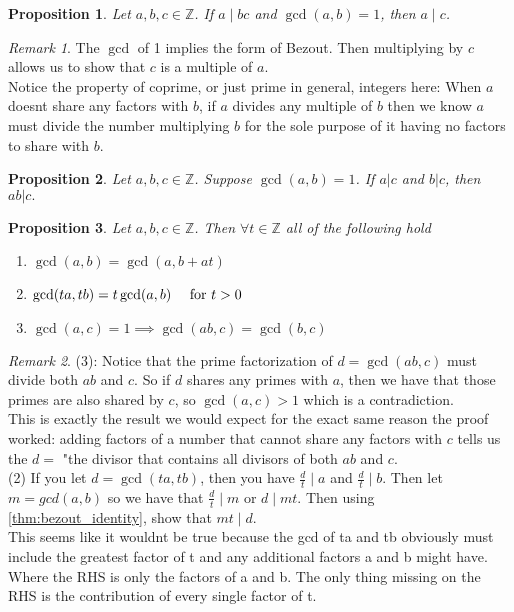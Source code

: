 \documentclass{article}
\newtheorem{proposition}{Proposition}[section]
\theoremstyle{definition}
\theoremstyle{remark}
\newtheorem{remark}{Remark}[section]
\begin{document}
\begin{proposition}\label{prp:coprime_divisor_of_product}
Let \(a,b,c \in \mathbb{Z}\). If \(a \mid bc \) and \(\gcd(a,b) = 1\), then \(a \mid c\).

\end{proposition}

\begin{remark}
The $\gcd$ of 1 implies the form of Bezout. Then multiplying by $c$ allows
us to show that $c$ is a multiple of $a$.\\
Notice the property of coprime, or just prime in general, integers
here: When $a$ doesnt share any factors with $b$, if $a$ divides any multiple
of $b$ then we know $a$ must divide the number multiplying $b$ for the sole
purpose of it having no factors to share with $b$.
\end{remark}





\begin{proposition}
Let $ a,b,c \in \mathbb{Z}$. Suppose $ \gcd(a,b) = 1$. If $a|c$ and $b|c$, then $ab|c.$
\end{proposition}





\begin{proposition}
Let $ a,b,c \in \mathbb{Z}$. Then $ \forall t \in \mathbb{Z}$ all of the following hold
\begin{enumerate}
\item $\gcd(a,b) = \gcd(a,b + at)$
\item $\gcd(ta,tb) = t\gcd(a,b) \quad \textnormal{ for } t > 0$
\item $\gcd(a,c) = 1 \implies \gcd(ab, c) = \gcd(b,c) $
\end{enumerate}

\end{proposition}
\begin{remark}
(3): Notice that the prime factorization of $ d = \gcd(ab,c)$ must 
divide both $ab$ and $c$. So if $d$ shares any primes with $a$, then 
we have that those primes are also shared by $c$, so $\gcd(a,c) > 1$ which 
is a contradiction. \\
This is exactly the result we would expect for the exact same reason the proof 
worked: adding factors of a number that cannot share any factors with $c$ tells 
us the $d =$ "the divisor that contains all divisors of both $ab$ and $c$.\\
(2) If you let $d = \gcd(ta,tb)$, then you have $\frac{d}{t}\mid a$ and 
$\frac{d}{t}\mid b$. Then let $m = gcd(a,b)$ so we have that $\frac{d}{t}\mid m$ or
$d \mid mt$. Then using \ref{thm:bezout_identity}, show that $mt \mid d$.\\
This seems like it wouldnt be true because the gcd of ta and tb obviously must 
include the greatest factor of t and any additional factors a and b might have. Where 
the RHS is only the factors of a and b. The only thing missing on the RHS is 
the contribution of every single factor of t. 
\end{remark}
\end{document}
